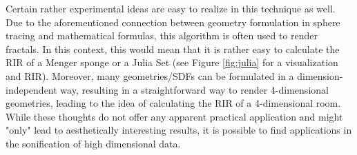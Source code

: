 \documentclass[twoside,a4paper]{article}
\begin{document}
Certain rather experimental ideas are easy to realize in this technique as well. Due to the aforementioned connection between geometry formulation in sphere tracing and mathematical formulas, this algorithm is often used to render fractals. In this context, this would mean that it is rather easy to calculate the RIR of a Menger sponge or a Julia Set (see Figure \ref{fig:julia} for a visualization and RIR). Moreover, many geometries/SDFs can be formulated in a dimension-independent way, resulting in a straightforward way to render 4-dimensional geometries, leading to the idea of calculating the RIR of a 4-dimensional room. While these thoughts do not offer any apparent practical application and might "only" lead to aesthetically interesting results, it is possible to find applications in the sonification of high dimensional data.





\nocite{*}


\end{document}
